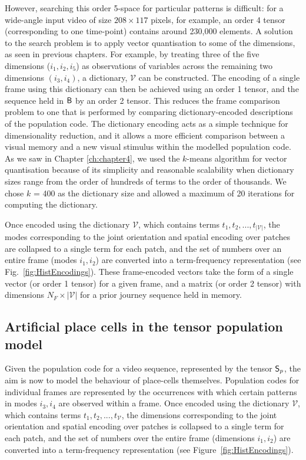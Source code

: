 However, searching this order 5-space for particular patterns is difficult: for a wide-angle input video of size $208\times117$ pixels, for example, an order 4 tensor (corresponding to one time-point) contains around 230,000 elements. A solution to the search problem is to apply vector quantisation to some of the dimensions, as seen in previous chapters.  For example, by treating three of the five dimensions ($i_1,i_2,i_5$) as observations of variables across the remaining two dimensions $(i_3,i_4)$, a dictionary, $\mathcal{V}$ can be constructed. The encoding of a single frame using this dictionary can then be achieved using an order 1 tensor, and the sequence held in $\mathsf{B}$ by an order 2 tensor. This reduces the frame comparison problem to one that is performed by comparing dictionary-encoded descriptions of the population code. The dictionary encoding acts as a simple technique for dimensionality reduction, and it allows a more efficient comparison between a visual memory and a new visual stimulus within the modelled population code. As we saw in Chapter \ref{ch:chapter4}, we used the $k$-means algorithm for vector quantisation because of its simplicity and reasonable scalability when dictionary sizes range from the order of hundreds of terms to the order of thousands. We chose $k$ = 400 as the dictionary size and allowed a maximum of 20 iterations for computing the dictionary.

Once encoded using the dictionary $\mathcal{V}$, which contains terms $t_1,t_2,...,t_{|\mathcal{V}|}$, the modes corresponding to the joint orientation and spatial encoding over patches are collapsed to a single term for each patch, and the set of numbers over an entire frame (modes $i_1,i_2$) are converted into a term-frequency representation \cite{Wu:2008} (see Fig.~\ref{fig:HistEncodings}).  These frame-encoded vectors take the form of a single vector (or order 1 tensor) for a given frame, and a matrix (or order 2 tensor) with dimensions $N_F\times|\mathcal{V}|$ for a prior journey sequence held in memory. 

\subsection{Artificial place cells in the tensor population model}
\label{sec:APC}

Given the population code for a video sequence, represented by the tensor $\mathsf{S}_p$, the aim is now to model the behaviour of place-cells themselves.   Population codes for individual frames are represented by the occurrences with which certain patterns in modes $i_3,i_4$ are observed within a frame.   Once encoded using the dictionary $\mathcal{V}$, which contains terms $t_1,t_2,...,t_{\mathcal{V}}$, the dimensions corresponding to the joint orientation and spatial encoding over patches is collapsed to a single term for each patch, and the set of numbers over the entire frame (dimensions $i_1,i_2$) are converted into a term-frequency representation \cite{Wu:2008} (see Figure~\ref{fig:HistEncodings}).

